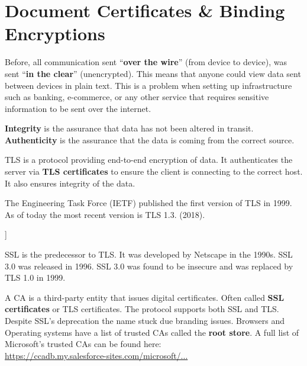 \section{Document Certificates \& Binding Encryptions}
Before, all communication sent ``\textbf{over the wire}'' (from device to device),
was sent ``\textbf{in the clear}'' (unencrypted). This means that anyone could 
view data sent between devices in plain text. This is a problem when setting up 
infrastructure such as banking, e-commerce, or any other service that requires
sensitive information to be sent over the internet.

\begin{Def}

    \textbf{Integrity} is the assurance that data has not been altered in transit.\\
    \textbf{Authenticity} is the assurance that the data is coming from the correct source.
\end{Def}
\begin{Def}

    TLS is a protocol providing end-to-end encryption of data. It authenticates
    the server via \textbf{TLS certificates} to ensure the client is connecting to 
    the correct host. It also ensures integrity of the data.

    The Engineering Task Force (IETF) published the first version of TLS in 1999. As of 
    today the most recent version is TLS 1.3. (2018).
    \hfill \cite{cloudflare_tls}
\end{Def}

\begin{Def}[Secure Sockets Layer (SSL) [Deprecated]]

    SSL is the predecessor to TLS. It was developed by Netscape in the 1990s. 
    SSL 3.0 was released in 1996. SSL 3.0 was found to be insecure and was replaced
    by TLS 1.0 in 1999.
    \hfill \cite{cloudflare_tls}
\end{Def}

\begin{Def}

    A CA is a third-party entity that issues digital certificates. Often called \textbf{SSL certificates} or TLS certificates.
    The protocol supports both SSL and TLS. Despite SSL's deprecation the name stuck due branding issues.
    Browsers and Operating systems have a list of trusted CAs called the \textbf{root store}.
    A full list of Microsoft's trusted CAs can be found here:\\ \href{https://ccadb.my.salesforce-sites.com/microsoft/IncludedCACertificateReportForMSFT}{https://ccadb.my.salesforce-sites.com/microsoft/...}
    \hfill \cite{kinsta_tls_ssl}
\end{Def}

